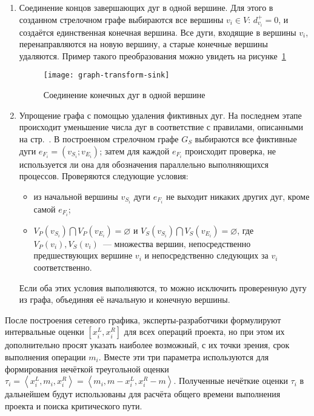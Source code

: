 \begin{enumerate}
\begin{enumerate}
	\end{enumerate}
	\item Соединение концов завершающих дуг в одной вершине. Для этого в созданном стрелочном графе выбираются все вершины $v_i \in V$: $d_{v_i}^+=0$, и создаётся единственная конечная вершина. Все дуги, входящие в вершины $v_i$, перенаправляются на новую вершину, а старые конечные вершины удаляются. Пример такого преобразования можно увидеть на рисунке~\ref{fig:graph-transform-sink}
	\begin{figure}[h!]
		\centering
		{
			\texttt{[image: graph-transform-sink]}
		}
		\caption{Соединение конечных дуг в одной вершине}
		\label{fig:graph-transform-sink}
	\end{figure}
	\item Упрощение графа с помощью удаления фиктивных дуг. На последнем этапе происходит уменьшение числа дуг в соответствие с правилами, описанными на стр.~\pageref{Taha:ConversionRules}. В построенном стрелочном графе $G_S$ выбираются все фиктивные дуги $e_{F_i}=\left(v_{S_i}; v_{E_i}\right)$; затем для каждой $e_{F_i}$ происходит проверка, не используется ли она для обозначения параллельно выполняющихся процессов. Проверяются следующие условия:
	\begin{itemize}
		\item из начальной вершины $v_{S_i}$ дуги $e_{F_i}$ не выходит никаких других дуг, кроме самой $e_{F_i}$;
		\item $V_P(v_{S_i}) \bigcap V_P(v_{E_i}) = \varnothing $ и $V_S(v_{S_i}) \bigcap V_S(v_{E_i}) = \varnothing$, где $V_P(v_i), V_S(v_i)$~--- множества вершин, непосредственно предшествующих вершине $v_i$ и непосредственно следующих за $v_i$ соответственно.
	\end{itemize}
	 Если оба этих условия выполняются, то можно исключить проверенную дугу из графа, объединяя её начальную и конечную вершины.
\end{enumerate}

После построения сетевого графика, эксперты-разработчики формулируют интервальные оценки $\left[ x_i^L, x_i^R \right]$ для всех операций проекта, но при этом их дополнительно просят указать наиболее возможный, с их точки зрения, срок выполнения операции $m_i$. Вместе эти три параметра используются для формирования нечёткой треугольной оценки $\tau_i=\left \langle x_i^L, m_i, x_i^R \right \rangle = \left \langle m_i, m-x_i^L, x_i^R-m \right \rangle$. Полученные нечёткие оценки $\tau_i$ в дальнейшем будут использованы для расчёта общего времени выполнения проекта и поиска критического пути.

